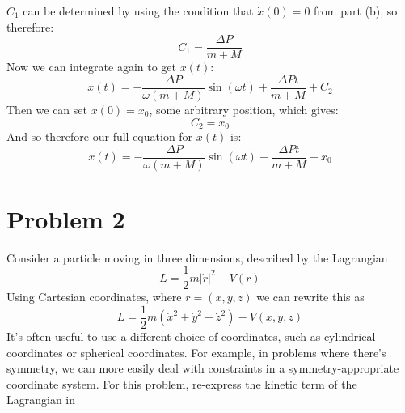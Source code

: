 \documentclass[10pt]{article}
\begin{document}
\begin{enumerate}[label=(\alph*)]
\begin{solution}
                $C_1$ can be determined by using the condition that $\dot x(0) = 0$ from part (b), so therefore: 
                \[ C_1 = \frac{\Delta P}{m+M}\]
                Now we can integrate again to get $x(t)$: 
                \[ x(t) = -\frac{\Delta P}{\omega(m+M)}\sin(\omega t) + \frac{\Delta Pt}{m+M} + C_2\]
                Then we can set $x(0) = x_0$, some arbitrary position, which gives: 
                \[ C_2 = x_0\]
                And so therefore our full equation for $x(t)$ is:
                \[ x(t) = -\frac{\Delta P}{\omega (m+M)}\sin(\omega t)  + \frac{\Delta Pt}{m+M} + x_0\]
            \end{solution}
        \end{enumerate}
        \pagebreak

        \section*{Problem 2}
        Consider a particle moving in three dimensions, described by the Lagrangian 
        \[ L = \frac 12 m |\dot r|^2 - V(r)\] 
        Using Cartesian coordinates, where $r = (x, y, z)$ we can rewrite this as
        \[ L = \frac 12 m \left( \dot x^2 + \dot y^2 + \dot z^2 \right) - V(x, y, z)\] 
        It's often useful to use a different choice of coordinates, such as cylindrical coordinates or spherical coordinates. For example, in problems where there's symmetry, we can more easily deal with constraints in a symmetry-appropriate coordinate system. For this problem, re-express the kinetic term of the Lagrangian in 
\end{document}
